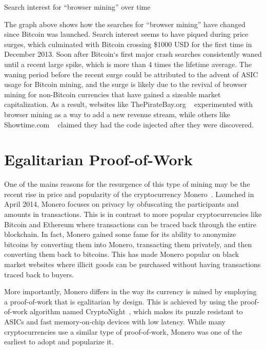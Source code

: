 \vspace*{-2mm}
\begin{center}
	\caption{Search interest for ``browser mining'' over time}
\end{center}
\vspace*{-1mm}

The graph above shows how the searches for ``browser mining'' have changed since Bitcoin was launched. Search interest seems to have piqued during price surges, which culminated with Bitcoin crossing \$1000 USD for the first time in December 2013. Soon after Bitcoin`s first major crash searches consistently waned until a recent large spike, which is more than 4 times the lifetime average. The waning period before the recent surge could be attributed to the advent of ASIC usage for Bitcoin mining, and the surge is likely due to the revival of browser mining for non-Bitcoin currencies that have gained a sizeable market capitalization. As a result, websites like ThePirateBay.org ~\cite{piratesbayhive} experimented with browser mining as a way to add a new revenue stream, while others like Showtime.com ~\cite{showtimehive} claimed they had the code injected after they were discovered.

\section{Egalitarian Proof-of-Work}
One of the mains reasons for the resurgence of this type of mining may be the recent rise in price and popularity of the cryptocurrency Monero~\cite{monero}. Launched in April 2014, Monero focuses on privacy by obfuscating the participants and amounts in transactions. This is in contrast to more popular cryptocurrencies like Bitcoin and Ethereum where transactions can be traced back through the entire blockchain. In fact, Monero gained some fame for its ability to anonymize bitcoins by converting them into Monero, transacting them privately, and then converting them back to bitcoins. This has made Monero popular on black market websites where illicit goods can be purchased without having transactions traced back to buyers. 


More importantly, Monero differs in the way its currency is mined by employing a proof-of-work that is egalitarian by design. This is achieved by using the proof-of-work algorithm named CryptoNight~\cite{cryptoknight}, which makes its puzzle resistant to ASICs and fast memory-on-chip devices with low latency. While many cryptocurrencies use a similar type of proof-of-work, Monero was one of the earliest to adopt and popularize it. 


